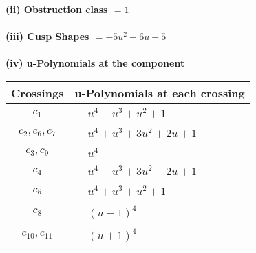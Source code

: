 \documentclass[1p]{elsarticle_modified}
\theoremstyle{definition}
\begin{document}
\flushleft \textbf{(ii) Obstruction class $= 1$}\\~\\
\flushleft \textbf{(iii) Cusp Shapes $= -5 u^2-6 u-5$}\\~\\
\newpage\renewcommand{\arraystretch}{1}
\flushleft \textbf{(iv) u-Polynomials at the component}\newline \\
\begin{tabular}{m{50pt}|m{274pt}}
Crossings & \hspace{64pt}u-Polynomials at each crossing \\
\hline $$\begin{aligned}c_{1}\end{aligned}$$&$\begin{aligned}
&u^4- u^3+u^2+1
\end{aligned}$\\
\hline $$\begin{aligned}c_{2},c_{6},c_{7}\end{aligned}$$&$\begin{aligned}
&u^4+u^3+3 u^2+2 u+1
\end{aligned}$\\
\hline $$\begin{aligned}c_{3},c_{9}\end{aligned}$$&$\begin{aligned}
&u^4
\end{aligned}$\\
\hline $$\begin{aligned}c_{4}\end{aligned}$$&$\begin{aligned}
&u^4- u^3+3 u^2-2 u+1
\end{aligned}$\\
\hline $$\begin{aligned}c_{5}\end{aligned}$$&$\begin{aligned}
&u^4+u^3+u^2+1
\end{aligned}$\\
\hline $$\begin{aligned}c_{8}\end{aligned}$$&$\begin{aligned}
&(u-1)^4
\end{aligned}$\\
\hline $$\begin{aligned}c_{10},c_{11}\end{aligned}$$&$\begin{aligned}
&(u+1)^4
\end{aligned}$\\
\hline
\end{tabular}\\~\\
\end{document}
